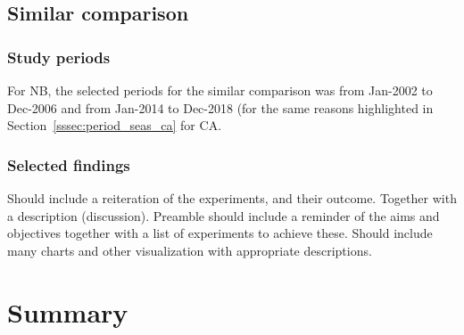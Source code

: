 \subsection{Similar comparison}

\subsubsection{Study periods}

For \ac{NB}, the selected periods for the similar comparison was from Jan-2002 to Dec-2006 and from Jan-2014 to Dec-2018 (for the same reasons highlighted in Section~\ref{sssec:period_seas_ca} for \ac{CA}.

\subsubsection{Selected findings}









Should include a reiteration of the experiments, and their outcome.  Together with a description (discussion).  Preamble should include a reminder of the aims and objectives together with a list of experiments to achieve these.  Should include many charts and other visualization with appropriate descriptions.  

\Blindtext

\section*{Summary}
\blindtext\enlargethispage{\baselineskip} %
